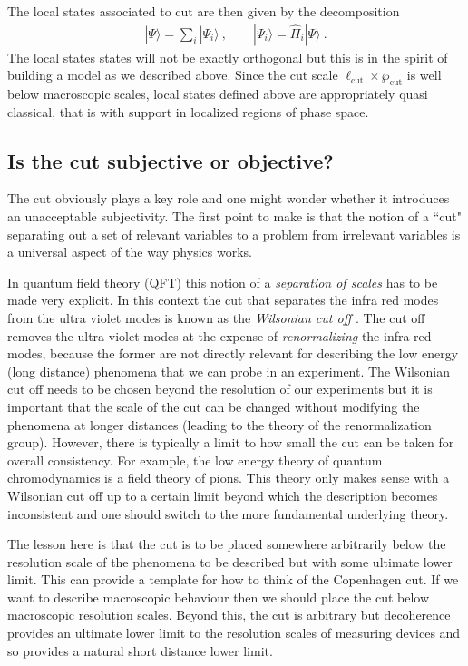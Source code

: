 \documentclass[12pt]{article}
\theoremstyle{plain}
\theoremstyle{definition}
\theoremstyle{remark}
\def\ket#1{| #1\rangle}
\newcommand{\EQ}[1]{\begin{equation}\begin{split} #1
\end{split}\end{equation}}
\begin{document}
The local states associated to cut are then given by the decomposition
\EQ{
\ket{\Psi}=\sum_i\ket{\Psi_i}\ ,\qquad \ket{\Psi_i}=\hat\Pi_i\ket{\Psi}\ .
}
The local states states will not be exactly orthogonal but this is in the spirit of building a model as we described above. Since the cut scale $\ell_\text{cut}\times\wp_\text{cut}$  is well below macroscopic scales, local states defined above are appropriately quasi classical, that is with support in localized regions of phase space.

\subsection{Is the cut subjective or objective?}

The cut obviously plays a key role and one might wonder whether it introduces an unacceptable  subjectivity. 
The first point to make is that the notion of a ``cut" separating out a set of relevant variables to a problem from irrelevant variables is a universal aspect of the way physics works.

In quantum field theory (QFT) this notion of a {\it separation of scales\/} has to be made very explicit. In this context the cut that separates the infra red modes from the ultra violet modes is known as the {\it Wilsonian cut off\/} \cite{Wilson:1983}. The cut off removes the ultra-violet modes at the expense of {\it renormalizing\/} the infra red modes, because the former are
not directly relevant for describing the low energy (long distance) phenomena that we can probe in an experiment. The Wilsonian cut off needs to be chosen beyond the resolution of our experiments but it is important that the scale of the cut can be changed without modifying the phenomena at longer distances (leading to the theory of the renormalization group). However, there is typically a limit to how small the cut can be taken for overall consistency. For example, the low energy theory of quantum chromodynamics is a field theory of pions. This theory only makes sense with a Wilsonian cut off up to a certain limit beyond which the description becomes inconsistent and one should switch to the more fundamental underlying theory. 

The lesson here is that the cut is to be placed somewhere arbitrarily below the resolution scale of the phenomena to be described but with some ultimate lower limit. This can provide a template for how to think of the Copenhagen cut. If we want to describe macroscopic behaviour then we should place the cut below macroscopic resolution scales. Beyond this, the cut is arbitrary but decoherence provides an ultimate lower limit to the resolution scales of measuring devices and so provides a natural short distance lower limit. 
\end{document}
